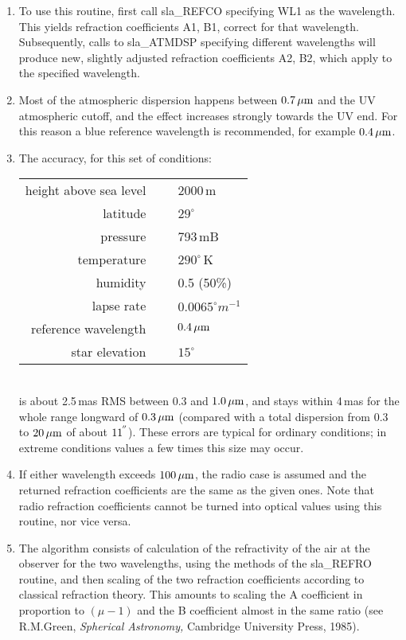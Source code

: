 \documentclass[11pt,twoside]{article}
\newcommand{\arcseci}[1] {$#1\hspace{-0.05em}$\raisebox{-0.5ex}
                         {$^{'\hspace{-0.1em}'}$}}
\renewcommand{\arcseci}[1] {$#1\hspace{-0.05em}^{'\hspace{-0.1em}'}$}
\begin{document}
{
 \begin{enumerate}
  \item To use this routine, first call sla\_REFCO specifying WL1 as the
        wavelength.  This yields refraction coefficients A1, B1, correct
        for that wavelength.  Subsequently, calls to sla\_ATMDSP specifying
        different wavelengths will produce new, slightly adjusted
        refraction coefficients A2, B2, which apply to the specified wavelength.
  \item Most of the atmospheric dispersion happens between $0.7\,\mu{\rm m}$
        and the UV atmospheric cutoff, and the effect increases strongly
        towards the UV end.  For this reason a blue reference wavelength
        is recommended, for example $0.4\,\mu{\rm m}$.
  \item The accuracy, for this set of conditions: \\[1pc]
   \hspace*{5ex} \begin{tabular}{rcl}
        height above sea level & ~ & 2000\,m \\
                      latitude & ~ & $29^\circ$ \\
                      pressure & ~ & 793\,mB \\
                   temperature & ~ & $290^\circ$\,K \\
                      humidity & ~ & 0.5 (50\%) \\
                    lapse rate & ~ & $0.0065^\circ m^{-1}$ \\
          reference wavelength & ~ & $0.4\,\mu{\rm m}$ \\
                star elevation & ~ & $15^\circ$ \\
                  \end{tabular}\\[1pc]
        is about 2.5\,mas RMS between 0.3 and $1.0\,\mu{\rm m}$, and stays
        within 4\,mas for the whole range longward of $0.3\,\mu{\rm m}$
        (compared with a total dispersion from 0.3 to $20\,\mu{\rm m}$
        of about \arcseci{11}).  These errors are typical for ordinary
        conditions;  in extreme conditions values a few times this size
        may occur.
  \item If either wavelength exceeds $100\,\mu{\rm m}$, the radio case
        is assumed and the returned refraction coefficients are the
        same as the given ones. Note that radio refraction coefficients
        cannot be turned into optical values using this routine, nor
        vice versa.
  \item The algorithm consists of calculation of the refractivity of the
        air at the observer for the two wavelengths, using the methods
        of the sla\_REFRO routine, and then scaling of the two refraction
        coefficients according to classical refraction theory.  This
        amounts to scaling the A coefficient in proportion to $(\mu-1)$ and
        the B coefficient almost in the same ratio (see R.M.Green,
        {\it Spherical Astronomy,}\/ Cambridge University Press, 1985).
 \end{enumerate}
}
\end{document}
